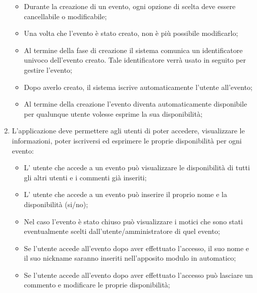 \begin{enumerate}
\begin{itemize}
\item Durante la creazione di un evento, ogni opzione di scelta deve essere cancellabile o modificabile;
\item Una volta che l'evento è stato creato, non è più possibile modificarlo;
\item Al termine della fase di creazione il sistema comunica un identificatore univoco dell'evento creato. Tale identificatore verrà usato in seguito per gestire l'evento;
\item Dopo averlo creato, il sistema iscrive automaticamente l'utente all'evento;
\item Al termine della creazione l'evento diventa automaticamente disponibile per qualunque utente volesse esprime la sua disponibilità;
\end{itemize}
\item L'applicazione deve permettere agli utenti di poter accedere, visualizzare le informazioni, poter iscriversi ed esprimere le proprie disponibilità per ogni evento:
\begin{itemize}
\item L' utente che accede a un evento può visualizzare le disponibilità di tutti gli altri utenti e i commenti già inseriti;
\item L' utente che accede a un evento può inserire il proprio nome e la disponibilità (si/no);
\item Nel caso l'evento è stato chiuso può visualizzare i motici che sono stati eventualmente scelti dall'utente/amministratore di quel evento;
\item Se l'utente accede all'evento dopo aver effettuato l'accesso, il suo nome e il suo nickname saranno inseriti nell'apposito modulo in automatico;
\item Se l'utente accede all'evento dopo aver effettuato l'accesso può lasciare un commento e modificare le proprie disponibilità;
\end{itemize}
\end{enumerate}